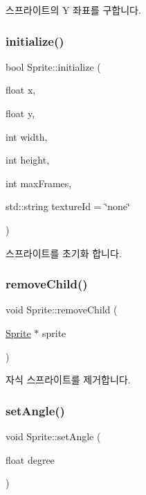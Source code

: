 스프라이트의 Y 좌표를 구합니다. \mbox{\label{class_sprite_aba9774f26aa07337d9e071b9e436dd95}} 
\subsubsection{\texorpdfstring{initialize()}{initialize()}}
{\footnotesize\ttfamily bool Sprite\+::initialize (\begin{DoxyParamCaption}\item[{float}]{x,  }\item[{float}]{y,  }\item[{int}]{width,  }\item[{int}]{height,  }\item[{int}]{max\+Frames,  }\item[{std\+::string}]{texture\+Id = {\ttfamily \char`\"{}none\char`\"{}} }\end{DoxyParamCaption})\hspace{0.3cm}{\ttfamily [virtual]}}

스프라이트를 초기화 합니다. \mbox{\label{class_sprite_a8c3e7df57403297e11bf8ea6672786ff}} 
\subsubsection{\texorpdfstring{removeChild()}{removeChild()}}
{\footnotesize\ttfamily void Sprite\+::remove\+Child (\begin{DoxyParamCaption}\item[{\mbox{\hyperlink{class_sprite}{Sprite}} $\ast$}]{sprite }\end{DoxyParamCaption})}

자식 스프라이트를 제거합니다. \mbox{\label{class_sprite_a7c8b37b2672f5454473f95f0440ad158}} 
\subsubsection{\texorpdfstring{setAngle()}{setAngle()}}
{\footnotesize\ttfamily void Sprite\+::set\+Angle (\begin{DoxyParamCaption}\item[{float}]{degree }\end{DoxyParamCaption})}

